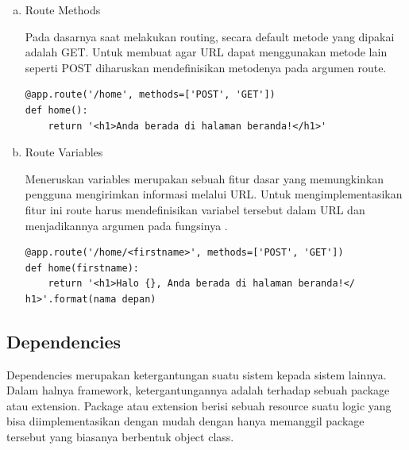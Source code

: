 \begin{enumerate}[a.]
	\item Route Methods
		
		Pada dasarnya saat melakukan routing, secara default metode yang dipakai adalah GET. Untuk membuat agar URL dapat menggunakan metode lain seperti POST diharuskan mendefinisikan metodenya pada argumen route.
\begin{lstlisting}
@app.route('/home', methods=['POST', 'GET']) 
def home(): 
    return '<h1>Anda berada di halaman beranda!</h1>'
\end{lstlisting}
	\item Route Variables
		
		Meneruskan variables merupakan sebuah fitur dasar yang memungkinkan pengguna mengirimkan informasi melalui URL. Untuk mengimplementasikan fitur ini route harus mendefinisikan variabel tersebut dalam URL dan menjadikannya argumen pada fungsinya \citep{meissamrasouli2020flaskroute}.
\begin{lstlisting}
@app.route('/home/<firstname>', methods=['POST', 'GET']) 
def home(firstname): 
    return '<h1>Halo {}, Anda berada di halaman beranda!</ h1>'.format(nama depan)
\end{lstlisting}
\end{enumerate}
		
	\subsection {Dependencies}
	
		Dependencies merupakan ketergantungan suatu sistem kepada sistem lainnya. Dalam halnya framework, ketergantungannya adalah terhadap sebuah package atau extension. Package atau extension berisi sebuah resource suatu logic yang bisa diimplementasikan dengan mudah dengan hanya memanggil package tersebut yang biasanya berbentuk object class.
		
